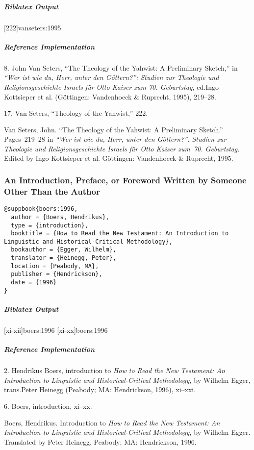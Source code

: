\documentclass[a4paper]{article}
\newenvironment{biboutput}{%
  \subparagraph{Biblatex Output}
}{\color{black}}
\newenvironment{refimp}{%
  \subparagraph{Reference Implementation}
  \color{reference-colour}
  \rm
}{\par\color{black}}
\begin{document}
\begin{biboutput}
  [222]{vanseters:1995}
\end{biboutput}

\begin{refimp}
  \hspace*{\bibindent}8. John Van Seters, “The Theology of the Yahwist: A
  Preliminary Sketch,” in \emph{“Wer ist wie du, Herr, unter den Göttern?”:
  Studien zur Theologie und Religionsgeschichte Israels für Otto Kaiser zum
70. Geburtstag,} ed.\@ Ingo Kottsieper et al. (Göttingen: Vandenhoeck \&
  Ruprecht, 1995), 219–28.

  \hspace*{\bibindent}17. Van Seters, “Theology of the Yahwist,” 222.

  \hangindent\bibindent Van Seters, John. “The Theology of the Yahwist: A
  Preliminary Sketch.” Pages~219–28 in \emph{“Wer ist wie du, Herr, unter den
  Göttern?”: Studien zur Theologie und Religionsgeschichte Israels für Otto
  Kaiser zum~70. Geburtstag.} Edited by Ingo Kottsieper et al. Göttingen:
  Vandenhoeck \& Ruprecht, 1995.
\end{refimp}

\subsubsection{An Introduction, Preface, or Foreword Written by Someone Other
Than the Author}

\begin{lstlisting}
@suppbook{boers:1996,
  author = {Boers, Hendrikus},
  type = {introduction},
  booktitle = {How to Read the New Testament: An Introduction to Linguistic and Historical-Critical Methodology},
  bookauthor = {Egger, Wilhelm},
  translator = {Heinegg, Peter},
  location = {Peabody, MA},
  publisher = {Hendrickson},
  date = {1996}
}
\end{lstlisting}  

\begin{biboutput}
  [xi-xii]{boers:1996}
  [xi-xx]{boers:1996}
\end{biboutput}

\begin{refimp}
  \hspace*{\bibindent}2. Hendrikus Boers, introduction to \emph{How to Read
  the New Testament: An Introduction to Linguistic and Historical-Critical
  Methodology,} by Wilhelm Egger, trans.\@ Peter Heinegg (Peabody; MA:
  Hendrickson, 1996), xi–xxi.

  \hspace*{\bibindent}6. Boers, introduction, xi–xx.

  \hangindent\bibindent Boers, Hendrikus. Introduction to \emph{How to Read
  the New Testament: An Introduction to Linguistic and Historical-Critical
  Methodology,} by Wilhelm Egger. Translated by Peter Heinegg. Peabody; MA:
  Hendrickson, 1996.
\end{refimp}
\end{document}

